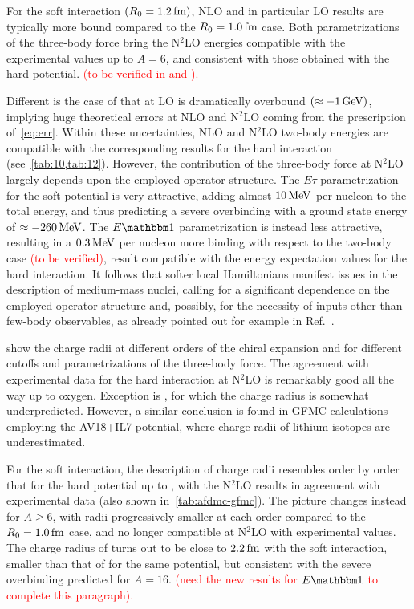 \documentclass[aps,prc,twocolumn,superscriptaddress,floatfix]{revtex4-1}
\newcommand{\red}[1]{\protect\textcolor{red}{#1}}
\begin{document}
For the soft interaction $(R_0=1.2\,\rm fm)$, NLO and in particular LO results are 
typically more bound compared to the $R_0=1.0\,\rm fm$ case. Both parametrizations
of the three-body force bring the N$^2$LO energies compatible with the experimental 
values up to $A=6$, and consistent with those obtained with the hard potential. 
\red{(to be verified in  and ).}

Different is the case of  that at LO is dramatically overbound
$(\approx -1\,\rm GeV)$, implying huge theoretical errors at NLO and N$^2$LO coming from 
the prescription of~\cref{eq:err}. Within these uncertainties, NLO and N$^2$LO two-body energies 
are compatible with the corresponding results for the hard interaction (see~\cref{tab:10,tab:12}).
However, the contribution of the three-body force at N$^2$LO largely depends upon
the employed operator structure. The $E\tau$ parametrization for the soft potential is very attractive,
adding almost $10\,\rm MeV$ per nucleon to the total energy, and thus
predicting a severe overbinding with a ground state energy of $\approx -260\,\rm MeV$.
The $E\mathbbm1$ parametrization is instead less attractive, resulting in a $0.3\,\rm MeV$ per 
nucleon more binding with respect to the two-body case \red{(to be verified)}, result compatible
with the energy expectation values for the hard interaction.
It follows that softer local Hamiltonians manifest issues in the description of medium-mass nuclei, 
calling for a significant dependence on the employed operator structure 
and, possibly, for the necessity of inputs other than few-body observables, as already pointed out 
for example in Ref.~\cite{Ekstrom:2015}.

 show the charge radii at different orders of the chiral 
expansion and for different cutoffs and parametrizations of the three-body force. 
The agreement with experimental data for the hard interaction at N$^2$LO is remarkably
good all the way up to oxygen. Exception is , for which the charge radius
is somewhat underpredicted. However, a similar conclusion is found in GFMC calculations
employing the AV18+IL7 potential, where charge radii of lithium isotopes are underestimated. 

For the soft interaction, the description of charge radii resembles order by order 
that for the hard potential up to , with the N$^2$LO results in agreement 
with experimental data (also shown in~\cref{tab:afdmc-gfmc}). 
The picture changes instead for $A\ge6$, with radii progressively smaller at each order
compared to the $R_0=1.0\,\rm fm$ case, and no longer compatible at N$^2$LO with experimental 
values. The charge radius of  turns out to be close to $2.2\,\rm fm$ with the 
soft interaction, smaller than that of  for the same potential, 
but consistent with the severe overbinding predicted for $A=16$.
\red{(need the new results for $E\mathbbm1$ to complete this paragraph).}
\end{document}
